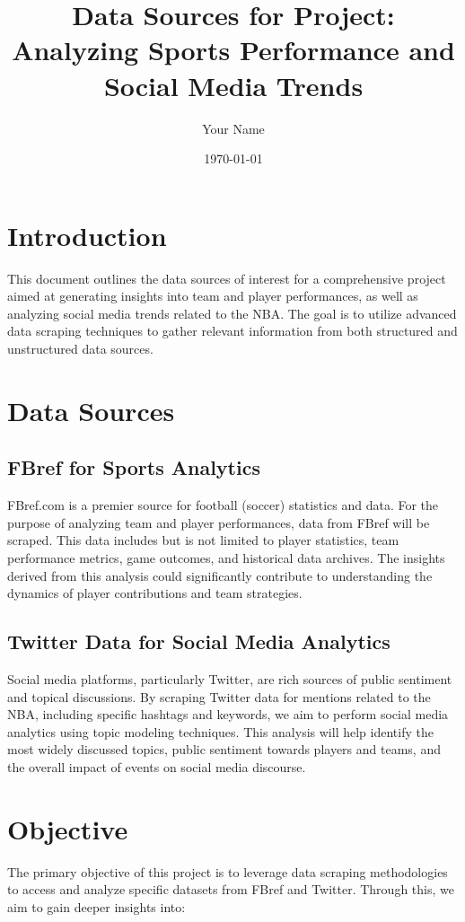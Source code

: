 \documentclass[12pt]{article}
\title{Data Sources for Project: Analyzing Sports Performance and Social Media Trends}
\author{Your Name}
\date{\today}
\begin{document}
\maketitle

\section{Introduction}
This document outlines the data sources of interest for a comprehensive project aimed at generating insights into team and player performances, as well as analyzing social media trends related to the NBA. The goal is to utilize advanced data scraping techniques to gather relevant information from both structured and unstructured data sources.

\section{Data Sources}

\subsection{FBref for Sports Analytics}
FBref.com is a premier source for football (soccer) statistics and data. For the purpose of analyzing team and player performances, data from FBref will be scraped. This data includes but is not limited to player statistics, team performance metrics, game outcomes, and historical data archives. The insights derived from this analysis could significantly contribute to understanding the dynamics of player contributions and team strategies.

\subsection{Twitter Data for Social Media Analytics}
Social media platforms, particularly Twitter, are rich sources of public sentiment and topical discussions. By scraping Twitter data for mentions related to the NBA, including specific hashtags and keywords, we aim to perform social media analytics using topic modeling techniques. This analysis will help identify the most widely discussed topics, public sentiment towards players and teams, and the overall impact of events on social media discourse.

\section{Objective}
The primary objective of this project is to leverage data scraping methodologies to access and analyze specific datasets from FBref and Twitter. Through this, we aim to gain deeper insights into:
\end{document}
